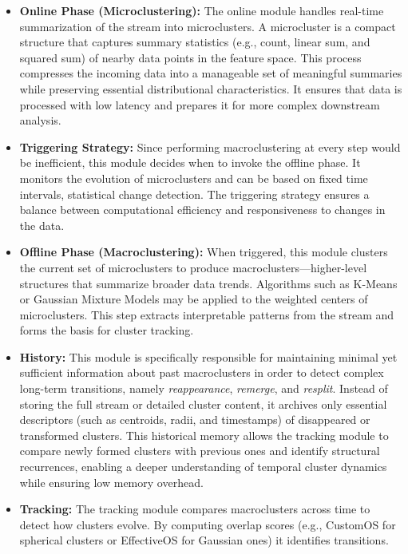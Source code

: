 \begin{itemize}

      \item \textbf{Online Phase (Microclustering):} The online module handles real-time
            summarization of the stream into microclusters. A microcluster is a compact
            structure that captures summary statistics (e.g., count, linear sum, and squared sum)
            of nearby data points in the feature space. This process compresses the incoming data
            into a manageable set of meaningful summaries while preserving essential distributional
            characteristics. It ensures that data is processed with low latency and prepares it
            for more complex downstream analysis.

      \item \textbf{Triggering Strategy:} Since performing macroclustering at every step
            would be inefficient, this module decides when to invoke the offline phase.
            It monitors the evolution of microclusters and can be based on fixed time intervals,
            statistical change detection. The triggering strategy ensures a balance between
            computational efficiency and responsiveness to changes in
            the data.

      \item \textbf{Offline Phase (Macroclustering):} When triggered, this module clusters the
            current set of microclusters to produce macroclusters—higher-level structures that
            summarize broader data trends. Algorithms such as K-Means or Gaussian Mixture
            Models may be applied to the weighted centers of microclusters. This step extracts
            interpretable patterns from the stream and forms the basis for cluster tracking.

      \item \textbf{History:} This module is specifically responsible for maintaining minimal
            yet sufficient information about past macroclusters in order to detect complex long-term
            transitions, namely \emph{reappearance}, \emph{remerge}, and \emph{resplit}.
            Instead of storing the full stream or detailed cluster content, it archives only
            essential descriptors (such as centroids, radii, and timestamps) of disappeared or
            transformed clusters. This historical memory allows the tracking module to compare
            newly formed clusters with previous ones and identify structural recurrences, enabling
            a deeper understanding of temporal cluster dynamics while ensuring low memory overhead.

      \item \textbf{Tracking:} The tracking module compares macroclusters across time to detect
            how clusters evolve. By computing overlap scores (e.g., CustomOS for spherical clusters
            or EffectiveOS for Gaussian ones) it identifies transitions.

\end{itemize}

